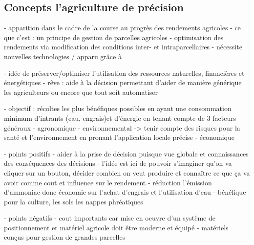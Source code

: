 \subsection{Concepts l'agriculture de précision}

- apparition dans le cadre de la course au progrès des rendements agricoles
- ce que c'est : un principe de gestion de parcelles agricoles
- optimisation des rendements via modification des conditions inter- et intraparcellaires
- nécessite nouvelles technologies / apparu grâce à

- idée de préserver/optimiser l'utilisation des ressources naturelles, financières et énergétiques
- rêve : aide à la décision permettant d'aider de manière générique les agriculteurs ou encore que tout soit automatiser

- objectif : récoltes les plus bénéfiques possibles en ayant une consommation minimum d'intrants (eau, engrais)et d'énergie en tenant compte de 3 facteurs généraux
  - agronomique
  - environnemental -> tenir compte des risques pour la santé et l'environnement en pronant l'application locale précise
  - économique
  
- points positifs 
  - aider à la prise de décision puisque vue globale et connaissances des conséquences des décisions
  - l'idée est ici de pouvoir s'imaginer qu'on va cliquer sur un bouton, décider combien on veut produire et connaître ce que ça va avoir comme cout et influence sur le rendement
  - réduction l'émission d'ammoniac donc économie sur l'achat d'engrais et l'utilisation d'eau
  - bénéfique pour la culture, les sols les nappes phréatiques

- points négatifs
  - cout importants car mise en oeuvre d'un système de positionnement et matériel agricole doit être moderne et équipé
  - matériels conçus pour gestion de grandes parcelles
  
